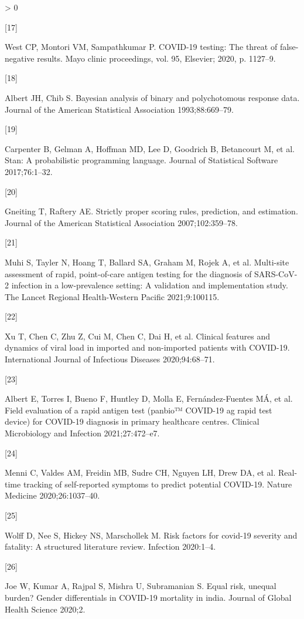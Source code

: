 \documentclass[]{elsarticle} %
\newlength{\cslhangindent}
\newlength{\csllabelwidth}
\newenvironment{CSLReferences}[2] %
 {%
  \setlength{\parindent}{0pt}
  \ifodd #1 \everypar{\setlength{\hangindent}{\cslhangindent}}\ignorespaces\fi
  \ifnum #2 > 0
  \setlength{\parskip}{#2\baselineskip}
  \fi
 }%
 {}
\newcommand{\CSLLeftMargin}[1]{\parbox[t]{\csllabelwidth}{#1}}
\newcommand{\CSLRightInline}[1]{\parbox[t]{\linewidth - \csllabelwidth}{#1}\break}
\begin{document}
\begin{CSLReferences}{0}{0}
\leavevmode\hypertarget{ref-west2020covid}{}%
\CSLLeftMargin{{[}17{]} }
\CSLRightInline{West CP, Montori VM, Sampathkumar P. COVID-19 testing:
The threat of false-negative results. Mayo clinic proceedings, vol. 95,
Elsevier; 2020, p. 1127--9.}

\leavevmode\hypertarget{ref-albert1993bayesian}{}%
\CSLLeftMargin{{[}18{]} }
\CSLRightInline{Albert JH, Chib S. Bayesian analysis of binary and
polychotomous response data. Journal of the American Statistical
Association 1993;88:669--79.}

\leavevmode\hypertarget{ref-carpenter2017stan}{}%
\CSLLeftMargin{{[}19{]} }
\CSLRightInline{Carpenter B, Gelman A, Hoffman MD, Lee D, Goodrich B,
Betancourt M, et al. Stan: A probabilistic programming language. Journal
of Statistical Software 2017;76:1--32.}

\leavevmode\hypertarget{ref-gneiting2007strictly}{}%
\CSLLeftMargin{{[}20{]} }
\CSLRightInline{Gneiting T, Raftery AE. Strictly proper scoring rules,
prediction, and estimation. Journal of the American Statistical
Association 2007;102:359--78.}

\leavevmode\hypertarget{ref-muhi2021multi}{}%
\CSLLeftMargin{{[}21{]} }
\CSLRightInline{Muhi S, Tayler N, Hoang T, Ballard SA, Graham M, Rojek
A, et al. Multi-site assessment of rapid, point-of-care antigen testing
for the diagnosis of SARS-CoV-2 infection in a low-prevalence setting: A
validation and implementation study. The Lancet Regional Health-Western
Pacific 2021;9:100115.}

\leavevmode\hypertarget{ref-xu2020clinical}{}%
\CSLLeftMargin{{[}22{]} }
\CSLRightInline{Xu T, Chen C, Zhu Z, Cui M, Chen C, Dai H, et al.
Clinical features and dynamics of viral load in imported and
non-imported patients with COVID-19. International Journal of Infectious
Diseases 2020;94:68--71.}

\leavevmode\hypertarget{ref-albert2021field}{}%
\CSLLeftMargin{{[}23{]} }
\CSLRightInline{Albert E, Torres I, Bueno F, Huntley D, Molla E,
Fernández-Fuentes MÁ, et al. Field evaluation of a rapid antigen test
(panbio™ COVID-19 ag rapid test device) for COVID-19 diagnosis in
primary healthcare centres. Clinical Microbiology and Infection
2021;27:472--e7.}

\leavevmode\hypertarget{ref-menni2020real}{}%
\CSLLeftMargin{{[}24{]} }
\CSLRightInline{Menni C, Valdes AM, Freidin MB, Sudre CH, Nguyen LH,
Drew DA, et al. Real-time tracking of self-reported symptoms to predict
potential COVID-19. Nature Medicine 2020;26:1037--40.}

\leavevmode\hypertarget{ref-wolff2020risk}{}%
\CSLLeftMargin{{[}25{]} }
\CSLRightInline{Wolff D, Nee S, Hickey NS, Marschollek M. Risk factors
for covid-19 severity and fatality: A structured literature review.
Infection 2020:1--4.}

\leavevmode\hypertarget{ref-joe2020equal}{}%
\CSLLeftMargin{{[}26{]} }
\CSLRightInline{Joe W, Kumar A, Rajpal S, Mishra U, Subramanian S. Equal
risk, unequal burden? Gender differentials in COVID-19 mortality in
india. Journal of Global Health Science 2020;2.}

\end{CSLReferences}
\end{document}
